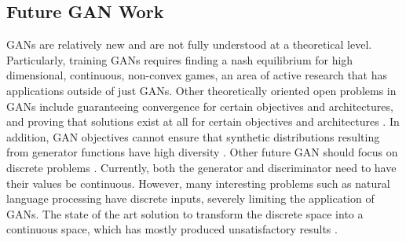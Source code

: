 \documentclass{article}
\begin{document}
\subsection{Future GAN Work}
GANs are relatively new and are not fully understood at a theoretical level. Particularly, training GANs requires finding a nash equilibrium for high dimensional, continuous, non-convex games, an area of active research that has applications outside of just GANs. Other theoretically oriented open problems in GANs include guaranteeing convergence for certain objectives and architectures, and proving that solutions exist at all for certain objectives and architectures \citep{Arora17}. In addition, GAN objectives cannot ensure that synthetic distributions resulting from generator functions have high diversity \citep{Arora17}. Other future GAN should focus on discrete problems \citep{Che+al-2017-augmented}. Currently, both the generator and discriminator need to have their values be continuous. However, many interesting problems such as natural language processing have discrete inputs, severely limiting the application of GANs. The state of the art solution to transform the discrete space into a continuous space, which has mostly produced unsatisfactory results \citep{Che+al-2017-augmented}.




\end{document}
